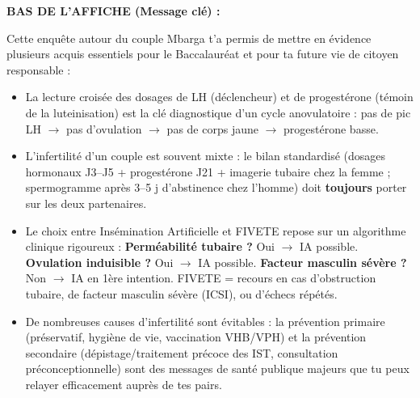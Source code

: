 \documentclass[11pt]{article}
\newcommand{\cle}[1]{{\popxbold\color{popdark}#1}}
\newcounter{popsec}
\newcounter{popsub}
\newcommand{\courssub}[1]{%
  \stepcounter{popsub}%
  \par\vspace{9pt}\noindent{\popxbold\fontsize{11.5}{13}\selectfont\color{popink}{\color{poporange}\thepopsec.\thepopsub}\hspace{6pt}#1}\par\nopagebreak\vspace{4pt}
}
\begin{document}
\begin{exoresolu}
\begin{exemplebox}
\textbf{BAS DE L'AFFICHE (Message clé) :}
\begin{center}
\end{center}
\end{exemplebox}
\end{exoresolu}

\courssub{Bilan de l'activité}

Cette enquête autour du couple Mbarga t'a permis de mettre en évidence plusieurs acquis essentiels pour le Baccalauréat et pour ta future vie de citoyen responsable :

\begin{itemize}
\item La lecture croisée des dosages de \cle{LH} (déclencheur) et de \cle{progestérone} (témoin de la luteinisation) est la \cle{clé diagnostique} d'un cycle anovulatoire : pas de pic LH $\rightarrow$ pas d'ovulation $\rightarrow$ pas de corps jaune $\rightarrow$ progestérone basse.
\item L'infertilité d'un couple est souvent \cle{mixte} : le bilan standardisé (dosages hormonaux J3--J5 + progestérone J21 + imagerie tubaire chez la femme ; spermogramme après 3--5 j d'abstinence chez l'homme) doit \textbf{toujours} porter sur les deux partenaires.
\item Le choix entre \cle{Insémination Artificielle} et \cle{FIVETE} repose sur un algorithme clinique rigoureux : \textbf{Perméabilité tubaire ?} Oui $\rightarrow$ IA possible. \textbf{Ovulation induisible ?} Oui $\rightarrow$ IA possible. \textbf{Facteur masculin sévère ?} Non $\rightarrow$ IA en 1ère intention. FIVETE = recours en cas d'obstruction tubaire, de facteur masculin sévère (ICSI), ou d'échecs répétés.
\item De nombreuses causes d'infertilité sont \cle{évitables} : la prévention primaire (préservatif, hygiène de vie, vaccination VHB/VPH) et la prévention secondaire (dépistage/traitement précoce des IST, consultation préconceptionnelle) sont des messages de santé publique majeurs que tu peux relayer efficacement auprès de tes pairs.
\end{itemize}
\end{document}
